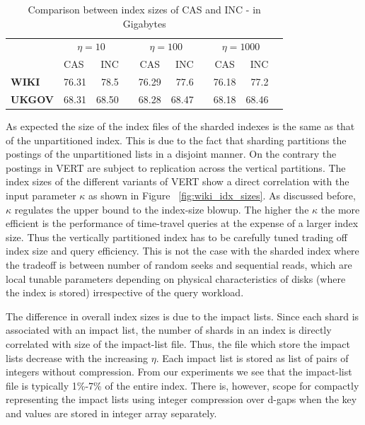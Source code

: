 \begin{table}\centering
\begin{tabular}{@{}llrrcrrcrr@{}}\toprule
& \multicolumn{2}{c}{\textbf{$\eta=10$}} & \phantom{ab} & \multicolumn{2}{c}{\textbf{$\eta=100$}}& \phantom{ab} & \multicolumn{2}{c}{\textbf{$\eta=1000$}}\\ 
\cmidrule{2-3} \cmidrule{5-6} \cmidrule{8-9}
 & CAS & INC && CAS & INC && CAS & INC\\ \midrule
\textbf{WIKI} & 76.31 & 78.5 && 76.29 & 77.6 && 76.18 & 77.2\\
\textbf{UKGOV} & 68.31 & 68.50 && 68.28 & 68.47 && 68.18 & 68.46\\
 \bottomrule
\end{tabular}
\caption{Comparison between index sizes of CAS and INC - in Gigabytes}

\label{tab:sharding_idx_sizes}
\end{table}

As expected the size of the index files of the sharded indexes is the same as that of the unpartitioned index. This is due to the fact
that sharding partitions the postings of the unpartitioned lists in a
disjoint manner. On the contrary the postings in VERT are
subject to replication across the vertical partitions. The index sizes of the different variants of VERT show a direct correlation with the input
parameter $\kappa$ as shown in Figure ~\ref{fig:wiki_idx_sizes}. As
discussed before, $\kappa$ regulates the upper bound to the index-size
blowup. The higher the $\kappa$ the more efficient is the performance
of time-travel queries at the expense of a larger index
size.  Thus the vertically partitioned index has to be carefully tuned trading off index size and query
efficiency. This is not the case with the sharded index where the
tradeoff is between number of random seeks and sequential reads, which
are local tunable parameters depending on physical characteristics of
disks (where the index is stored) irrespective of the query
workload. 

The difference in overall index sizes is due to the impact lists. Since each shard is associated with an impact list, the number of shards in an index is directly correlated with size of the impact-list file. Thus, the file which store the impact lists decrease with the increasing $\eta$. Each impact list is stored as list of pairs of integers without compression. From our experiments we see that the impact-list file is typically 1\%-7\% of the entire index. There is, however, scope for compactly representing the impact lists using integer compression over d-gaps when the key and values are stored in integer array separately. 


